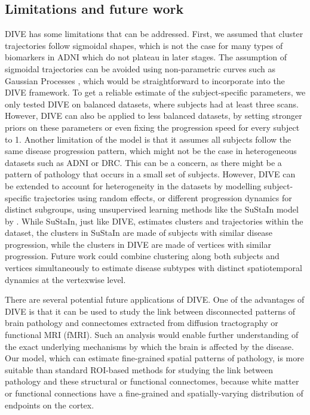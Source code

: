\subsection{Limitations and future work}

DIVE has some limitations that can be addressed. First, we assumed that cluster trajectories follow sigmoidal shapes, which is not the case for many types of biomarkers in ADNI which do not plateau in later stages. The assumption of sigmoidal trajectories can be avoided using non-parametric curves such as Gaussian Processes \cite{lorenzi2017disease}, which would be straightforward to incorporate into the DIVE framework. To get a reliable estimate of the subject-specific parameters, we only tested DIVE on balanced datasets, where subjects had at least three scans. However, DIVE can also be applied to less balanced datasets, by setting stronger priors on these parameters or even fixing the progression speed for every subject to 1. Another limitation of the model is that it assumes all subjects follow the same disease progression pattern, which might not be the case in heterogeneous datasets such as ADNI or DRC. This can be a concern, as there might be a pattern of pathology that occurs in a small set of subjects. However, DIVE can be extended to account for heterogeneity in the datasets by modelling subject-specific trajectories using random effects, or different progression dynamics for distinct subgroups, using unsupervised learning methods like the SuStaIn model by \cite{young2018uncovering}. While SuStaIn, just like DIVE, estimates clusters and trajectories within the dataset, the clusters in SuStaIn are made of subjects with similar disease progression, while the clusters in DIVE are made of vertices with similar progression. Future work could combine clustering along both subjects and vertices simultaneously to estimate disease subtypes with distinct spatiotemporal dynamics at the vertexwise level.

There are several potential future applications of DIVE. One of the advantages of DIVE is that it can be used to study the link between disconnected patterns of brain pathology and connectomes extracted from diffusion tractography or functional MRI (fMRI). Such an analysis would enable further understanding of the exact underlying mechanisms by which the brain is affected by the disease. Our model, which can estimate fine-grained spatial patterns of pathology, is more suitable than standard ROI-based methods for studying the link between pathology and these structural or functional connectomes, because white matter or functional connections have a fine-grained and spatially-varying distribution of endpoints on the cortex.


